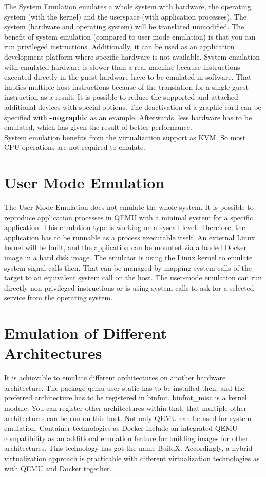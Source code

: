 The System Emulation emulates a whole system with hardware, the operating system (with the kernel) and the userspace (with application processes). 
The system (hardware and operating system) will be translated unmodified. The benefit of system emulation (compared to user mode emulation) is that you can run privileged instructions\cite{Butt2011}. 
Additionally, it can be used as an application development platform where specific hardware is not available. 
System emulation with emulated hardware is slower than a real machine because instructions executed directly in the guest hardware have to be emulated in software. 
That implies multiple host instructions because of the translation for a single guest instruction as a result\cite[~p.1]{Tong2014}.
It is possible to reduce the supported and attached additional devices with special options. The deactivation of a graphic card can be specified with \textbf{-nographic} as an example. Afterwards, less hardware has to be emulated, which has given the result of better performance.  \\
System emulation benefits from the virtualization support as KVM. So most CPU operations are not required to emulate.

\section{User Mode Emulation}

The User Mode Emulation does not emulate the whole system. It is possible to reproduce application processes in QEMU with a minimal system for a specific application. 
This emulation type is working on a syscall level. Therefore, the application has to be runnable as a process executable itself. 
An external Linux kernel will be built, and the application can be mounted via a loaded Docker image in a hard disk image. The emulator is using the Linux kernel to emulate system signal calls then. That can be managed by mapping system calls of the target to an equivalent system call on the host.
The user-mode emulation can run directly non-privileged instructions or is using system calls to ask for a selected service from the operating system\cite{Butt2011}.


\section{Emulation of Different Architectures}

It is achievable to emulate different architectures on another hardware architecture. The package qemu-user-static has to be installed then, and the preferred architecture has to be registered in binfmt. binfmt\_misc is a kernel module. 
You can register other architectures within that, that multiple other architectures can be run on this host. 
Not only QEMU can be used for system emulation. Container technologies as Docker include an integrated QEMU compatibility as an additional emulation feature for building images for other architectures. 
This technology has got the name BuildX. Accordingly, a hybrid virtualization approach is practicable with different virtualization technologies as with QEMU and Docker together.


